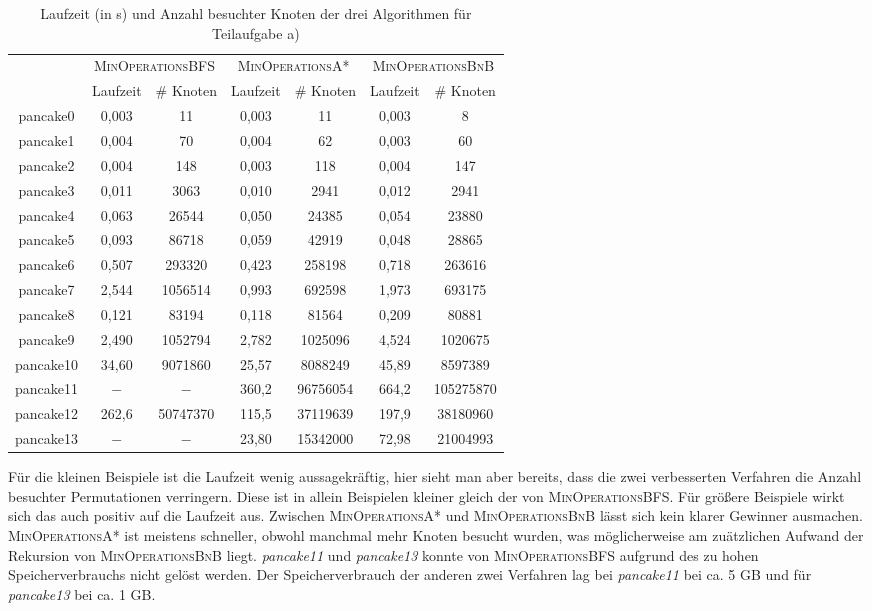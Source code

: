 \documentclass[a4paper, 10pt, ngerman]{article}
\begin{document}
\begin{table}[H]
    \centering
    \begin{tabular}{c c c c c c c}
        & \multicolumn{2}{c}{\textsc{MinOperationsBFS}} &
        \multicolumn{2}{c}{\textsc{MinOperationsA*}} &
        \multicolumn{2}{c}{\textsc{MinOperationsBnB}} \\
        & Laufzeit & \# Knoten & Laufzeit & \# Knoten & Laufzeit & \# Knoten \\
        \cmidrule{1-7}
        pancake0 & 0,003 & 11 & 0,003 & 11 & 0,003 & 8 \\
        pancake1 & 0,004 & 70 & 0,004 & 62 & 0,003 & 60  \\
        pancake2 & 0,004 & 148 & 0,003 & 118 & 0,004 & 147  \\
        pancake3 & 0,011 & 3063 & 0,010 & 2941 & 0,012 & 2941  \\
        pancake4 & 0,063 & 26544 & 0,050 & 24385 & 0,054 & 23880 \\
        pancake5 & 0,093 & 86718 & 0,059 & 42919 & 0,048 & 28865 \\
        pancake6 & 0,507 & 293320 & 0,423 & 258198 & 0,718 & 263616 \\
        pancake7 & 2,544 & 1056514 & 0,993 & 692598 & 1,973 & 693175 \\
        pancake8 & 0,121 & 83194 & 0,118 & 81564 & 0,209 & 80881 \\
        pancake9 & 2,490 & 1052794 & 2,782 & 1025096 & 4,524 & 1020675 \\
        pancake10 & 34,60 & 9071860 & 25,57 & 8088249 & 45,89 & 8597389 \\
        pancake11 & $-$ & $-$ & 360,2 & 96756054 & 664,2 & 105275870 \\
        pancake12 & 262,6 & 50747370 & 115,5 & 37119639 & 197,9 & 38180960 \\
        pancake13 & $-$ & $-$ & 23,80 & 15342000 & 72,98 & 21004993 \\
    \end{tabular}
    \caption{Laufzeit (in s) und Anzahl besuchter Knoten der drei Algorithmen für Teilaufgabe a)}
\end{table}

Für die kleinen Beispiele ist die Laufzeit wenig aussagekräftig, hier sieht man aber bereits, dass die zwei verbesserten Verfahren die Anzahl besuchter Permutationen verringern. Diese ist in allein Beispielen kleiner gleich der von \textsc{MinOperationsBFS}. Für größere Beispiele wirkt sich das auch positiv auf die Laufzeit aus. Zwischen \textsc{MinOperationsA*} und \textsc{MinOperationsBnB} lässt sich kein klarer Gewinner ausmachen. \textsc{MinOperationsA*} ist meistens schneller, obwohl manchmal mehr Knoten besucht wurden, was möglicherweise am zuätzlichen Aufwand der Rekursion von \textsc{MinOperationsBnB} liegt. \emph{pancake11} und \emph{pancake13} konnte von \textsc{MinOperationsBFS} aufgrund des zu hohen Speicherverbrauchs nicht gelöst werden. Der Speicherverbrauch der anderen zwei Verfahren lag bei \emph{pancake11} bei ca. 5 GB und für \emph{pancake13} bei ca. 1 GB.
\end{document}
